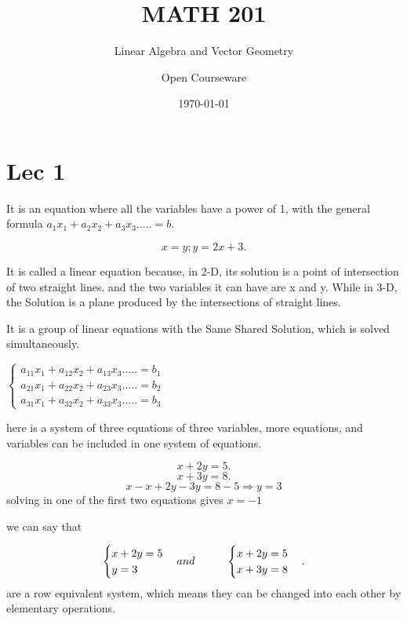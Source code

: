 \documentclass{article}
\title{MATH 201}
\subtitle{Linear Algebra and Vector Geometry}
\author{Open Courseware}
\date{\today}
\begin{document}
\mnfrontpage
\tableofcontents

\section{Lec 1}

\begin{definition}
   It is an equation where all the variables have a power of 1, with the general formula $a_1x_1+a_2x_2+a_3x_3.....=b$.
\end{definition}

\begin{example}
    \[
       x=y; y=2x+3
    .\] 
\end{example}

It is called a linear equation because, in 2-D, its solution is a point of intersection of two straight lines. and the two variables it can have are x and y. While in 3-D, the Solution is a plane produced by the intersections of straight lines. 

\begin{definition}
    It is a group of linear equations with
the Same Shared Solution, which is solved simultaneously. 
\end{definition}
\begin{center}

$\begin{cases}
    a_{11}x_1+a_{12}x_2+a_{13}x_3.....=b_1\\
  a_{21}x_1+a_{22}x_2+a_{23}x_3.....=b_2\\
  a_{31}x_1+a_{32}x_2+a_{33}x_3.....=b_3
\end{cases}$
  
\end{center}
here is a system of three equations of three variables, more equations, and variables can be included in one system of equations.
\begin{example}
   \[
      x+2y=5 
      .\]
      \[
      x+3y=8 
      .\]
    \[
     x-x+2y-3y=8-5 \Rightarrow y=3      
    \]      
      solving in one of the first two equations gives $x=-1$
\end{example}

we can say that 

\[
   \begin{cases}
        x+2y=5 \\ 
        y=3
    \end{cases} 
    and  \hspace{1cm} 
    \begin{cases} 
        x+2y=5 \\ 
        x+3y=8 
    \end{cases} \\
.\]
are a row equivalent system, which means they can be changed into each other by elementary operations. 
\end{document}
